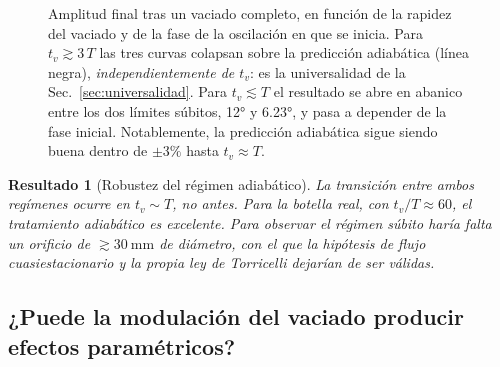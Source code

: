 \documentclass[11pt,a4paper]{article}
\newtheorem{resultado}{Resultado}
\begin{document}
\begin{figure}[H]
\centering
{}
\caption{Amplitud final tras un vaciado completo, en función de la rapidez del vaciado y de la fase
de la oscilación en que se inicia. Para $t_v\gtrsim 3\,T$ las tres curvas colapsan sobre la
predicción adiabática (línea negra), \emph{independientemente de $t_v$}: es la universalidad de la
Sec.~\ref{sec:universalidad}. Para $t_v\lesssim T$ el resultado se abre en abanico entre los dos
límites súbitos, \ang{12} y \ang{6.23}, y pasa a depender de la fase inicial. Notablemente, la
predicción adiabática sigue siendo buena dentro de $\pm 3\%$ hasta $t_v\approx T$.}
\label{fig:subito}
\end{figure}

\begin{resultado}[Robustez del régimen adiabático]
La transición entre ambos regímenes ocurre en $t_v \sim T$, no antes. Para la botella real, con
$t_v/T \approx 60$, el tratamiento adiabático es excelente. Para observar el régimen súbito haría
falta un orificio de $\gtrsim\SI{30}{\milli\meter}$ de diámetro, con el que la hipótesis de flujo
cuasiestacionario y la propia ley de Torricelli dejarían de ser válidas.
\end{resultado}

\subsection{¿Puede la modulación del vaciado producir efectos paramétricos?}
\label{sec:parametrico}
\end{document}
